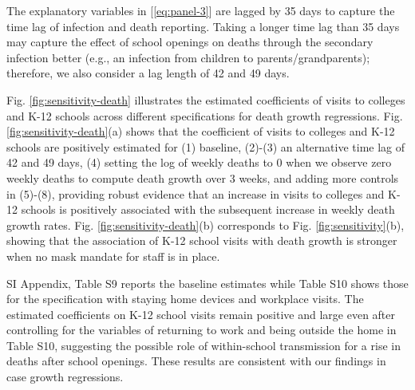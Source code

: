 \documentclass[9pt,twocolumn,twoside,lineno]{pnas-new}
\begin{document}
The explanatory variables in [\ref{eq:panel-3}]  are lagged by 35 days to capture the time lag of infection and death reporting. Taking a longer time lag than 35 days may capture the effect of school openings on deaths through the secondary infection better (e.g., an infection from children to parents/grandparents); therefore, we also consider a lag length of 42 and 49 days.
 
Fig. \ref{fig:sensitivity-death} illustrates the estimated coefficients of visits to colleges and K-12 schools across different specifications for death growth regressions. Fig. \ref{fig:sensitivity-death}(a) shows that the coefficient of visits to colleges and K-12 schools are positively estimated for (1) baseline, (2)-(3) an alternative time lag of  42 and 49 days, (4)  setting the log of weekly deaths to $0$ when we observe zero weekly deaths to compute death growth over 3 weeks,  and adding more controls in (5)-(8), providing robust evidence that an increase in visits to colleges and K-12 schools is positively associated with the subsequent increase in weekly death growth rates.   Fig. \ref{fig:sensitivity-death}(b) corresponds to  Fig. \ref{fig:sensitivity}(b), showing that the association of K-12 school visits with death growth is stronger when no mask mandate for staff is in place.

SI Appendix, Table S9 reports the baseline estimates while Table S10 shows those for the specification with staying home devices and workplace visits. The estimated coefficients on K-12 school visits remain positive and large even after controlling for the variables of returning to work and being outside the home in Table S10, suggesting the possible role of within-school transmission for a rise in deaths after school openings. These results are consistent with our findings in case growth regressions.
 
\end{document}
